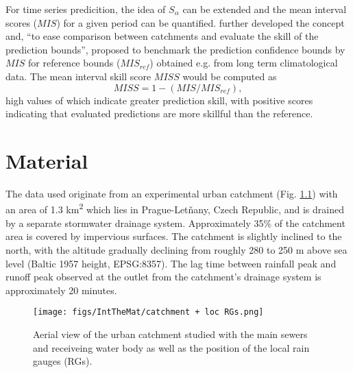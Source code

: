 \documentclass{ctuthesis}\usepackage[]{graphicx}\usepackage[]{color}
\begin{document}
For time series predicition, the idea of $S_\alpha$ can be extended and the mean interval scores ($M\!I\!S$) for a given period can be quantified. \cite{bourginTransferringGlobalUncertainty2015} further developed the concept and, \enquote{to ease comparison between catchments and evaluate the skill of the prediction bounds}, proposed to benchmark the prediction confidence bounds by $M\!I\!S$ for reference bounds ($M\!I\!S_{ref}$) obtained e.g. from long term climatological data. The mean interval skill score $M\!I\!S\!S$ would be computed as 
\begin{equation}
M\!I\!S\!S = 1 -  ( M\!I\!S  /  M\!I\!S_{ref} ),  
\end{equation}
high values of which indicate greater prediction skill, with positive scores indicating that evaluated predictions are more skillful than the reference.



        


\chapter{Material} \label{chap3}

The data used originate from an experimental urban catchment (Fig. \ref{3fig1}) with an area of 1.3 km\textsuperscript{2} which lies in Prague-Letňany, Czech Republic, and is drained by a separate stormwater drainage system. Approximately 35\% of the catchment area is covered by impervious surfaces. The catchment is slightly inclined to the north, with the altitude gradually declining from roughly 280 to 250 m above sea level (Baltic 1957 height, EPSG:8357). The lag time between rainfall peak and runoff peak observed at the outlet from the catchment's drainage system is approximately 20 minutes.


\begin{figure}[H]
\begin{center}
\texttt{[image: figs/IntTheMat/catchment + loc RGs.png]}
\caption{Aerial view of the urban catchment studied with the main sewers and receiveing water body as well as the position of the local rain gauges (RGs).} \label{3fig1}
\end{center}
\end{figure}
\end{document}
